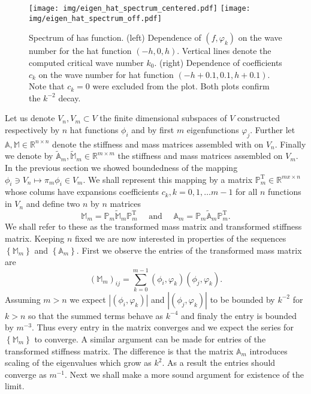\documentclass[a4paper,10pt]{article}
\newcommand{\R}{\ensuremath{\mathbb{R}}}
\newcommand{\inner}[2]{\ensuremath{\left(#1, #2\right)}}
\newcommand{\Amat}{\ensuremath{\mathbb{A}}}
\newcommand{\Mmat}{\ensuremath{\mathbb{M}}}
\newcommand{\Ammatt}{\ensuremath{\tilde{\mathbb{A}}_m}}              %
\newcommand{\Mmmatt}{\ensuremath{\tilde{\mathbb{M}}_m}}              %
\newcommand{\Ammat}{\ensuremath{\mathbb{A}_m}}               %
\newcommand{\Mmmat}{\ensuremath{\mathbb{M}_m}}               %
\newcommand{\Pmat}{\ensuremath{\mathbb{P}_m}}                  %
\newcommand{\Pmatt}{\ensuremath{\mathbb{P}_m^{\text{T}}}}       %
\begin{document}
  \begin{figure}
  \begin{center}
    \texttt{[image: img/eigen\_hat\_spectrum\_centered.pdf]}
    \texttt{[image: img/eigen\_hat\_spectrum\_off.pdf]}
  \end{center}
  \label{fig:eig_hat_spectrum}
  \caption{Spectrum of has function. (left) Dependence of $\inner{f}{\varphi_k}$
    on the wave number for the hat function $(-h, 0, h)$. Vertical lines denote
    the computed critical wave number $k_0$. (right) Dependence of coefficients
    $c_k$ on the wave number for hat function $(-h+0.1, 0.1, h+0.1)$. Note that
    $c_k=0$ were excluded from the plot. Both plots confirm the $k^{-2}$ decay.}
  \end{figure}

  Let us denote $V_n, V_m\subset V$ the finite dimensional subspaces of $V$
  constructed respectively by $n$ hat functions $\phi_i$ and by first $m$
  eigenfunctions $\varphi_j$. Further let $\Amat, \Mmat \in \R^{n \times n}$ denote
  the stiffness and mass matrices assembled with on $V_n$. Finally we denote
  by $\Ammatt, \Mmmatt \in \R^{m\times m}$ the stiffness and mass matrices
  assembled on $V_m$. In the previous section we showed boundedness of the
  mapping $\phi_i\ni V_n \mapsto \pi_m\phi_i \in V_m$.
  We shall represent this mapping by a matrix $\Pmatt\in\R^{m x\times n}$ whose
  colums have expansions coefficients $c_k, k=0,1, \dots m-1$ for all $n$
  functions in $V_n$ and define two $n$ by $n$ matrices
  \[
    \Mmmat = \Pmat\Mmmatt\Pmatt
    \quad{\text{ and }}\quad
    \Ammat = \Pmat\Ammatt\Pmatt.
  \]
  We shall refer to these as the transformed mass matrix and transformed
  stiffness matrix. Keeping $n$ fixed we are now interested in properties of
  the sequences $\left\{\Mmmat\right\}$ and $\left\{\Ammat\right\}$. First we
  observe the entries of the transformed mass matrix are
  \[
    \left(\Mmmat\right)_{ij} =
    \displaystyle\sum\limits_{k=0}^{m-1}
    \inner{\phi_i}{\varphi_k}\inner{\phi_j}{\varphi_k}.
  \]
  Assuming $m>n$ we expect $\left| \inner{\phi_i}{\varphi_k} \right|$ and
  $\left| \inner{\phi_j}{\varphi_k} \right|$ to be bounded by $k^{-2}$ for 
  $k>n$ so that the summed terms behave as $k^{-4}$ and finaly the entry
  is bounded by $m^{-3}$. Thus every entry in the matrix converges and we expect
  the series for $\left\{\Mmmat\right\}$ to converge. A similar argument can
  be made for entries of the transformed stiffness matrix. The difference is
  that the matrix $\Ammat$ introduces scaling of the eigenvalues which grow
  as $k^2$. As a result the entries should converge as $m^{-1}$. Next we shall
  make a more sound argument for existence of the limit.
\end{document}
